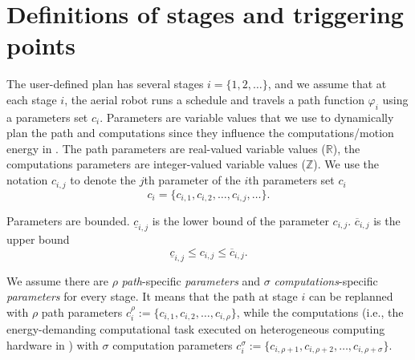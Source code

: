 \section{Definitions of stages and triggering points}
\label{sec:defs-stages-triggs}



The user-defined plan has several stages $i=\{1,2,\dots\}$, and we assume that at each stage $i$, the aerial robot runs a schedule and travels a path function $\varphi_i$ using a parameters set $c_i$.
Parameters are variable values that we use to dynamically plan the path and computations since they influence the computations/motion energy in . The path parameters are real-valued variable values ($\mathbb{R}$), the computations parameters are integer-valued variable values ($\mathbb{Z}$). We use the notation  $c_{i,j}$ to denote the $j$th parameter of the $i$th parameters set $c_i$
\begin{equation}
  c_i=\{c_{i,1},c_{i,2},\dots,c_{i,j},\dots\}.
\end{equation}

Parameters are bounded. $\underline{c}_{i,j}$ is the lower bound of the parameter $c_{i,j}$. $\overline{c}_{i,j}$ is the upper bound
\begin{equation}
  \underline{c}_{i,j}\leq c_{i,j}\leq\overline{c}_{i,j}.
\end{equation}

We assume there are $\rho$ \emph{path}-specific \emph{parameters} and $\sigma$ \emph{computations}-specific \emph{parameters} for every stage. It means that the path at stage $i$ can be replanned with $\rho$ path parameters
$c_i^\rho:=\{c_{i,1},c_{i,2},\dots,c_{i,\rho}\}$,
while the computations (i.e., the energy-demanding computational task executed on heterogeneous computing hardware in ) with $\sigma$ computation parameters 
$c_i^\sigma:=\{c_{i,\rho+1},c_{i,\rho+2},\dots,c_{i,\rho+\sigma}\}$.

